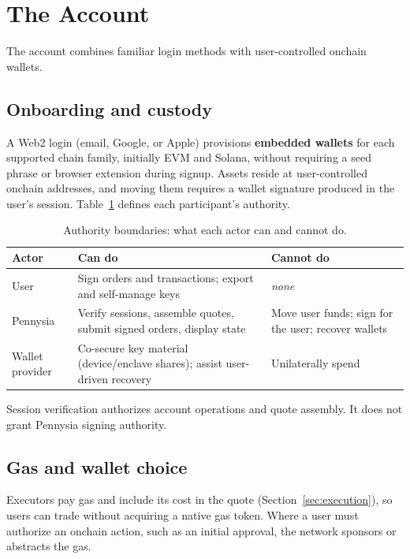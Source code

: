 \section{The Account}\label{sec:account}

The account combines familiar login methods with user-controlled onchain wallets.

\subsection{Onboarding and custody}

A Web2 login (email, Google, or Apple) provisions \textbf{embedded wallets} for each supported chain family, initially EVM and Solana, without requiring a seed phrase or browser extension during signup. Assets reside at user-controlled onchain addresses, and moving them requires a wallet signature produced in the user's session. Table~\ref{tab:authority} defines each participant's authority.

\begin{table}[ht]
\centering
\caption{Authority boundaries: what each actor can and cannot do.}
\label{tab:authority}
\begin{tabular}{@{}l>{\raggedright\arraybackslash}p{}>{\raggedright\arraybackslash}p{}@{}}
\toprule
\textbf{Actor} & \textbf{Can do} & \textbf{Cannot do} \\
\midrule
User & Sign orders and transactions; export and self-manage keys & \emph{none} \\
Pennysia & Verify sessions, assemble quotes, submit signed orders, display state & Move user funds; sign for the user; recover wallets \\
Wallet provider & Co-secure key material (device/enclave shares); assist user-driven recovery & Unilaterally spend \\
\bottomrule
\end{tabular}
\end{table}

Session verification authorizes account operations and quote assembly. It does not grant Pennysia signing authority.

\subsection{Gas and wallet choice}

Executors pay gas and include its cost in the quote (Section~\ref{sec:execution}), so users can trade without acquiring a native gas token. Where a user must authorize an onchain action, such as an initial approval, the network sponsors or abstracts the gas.

